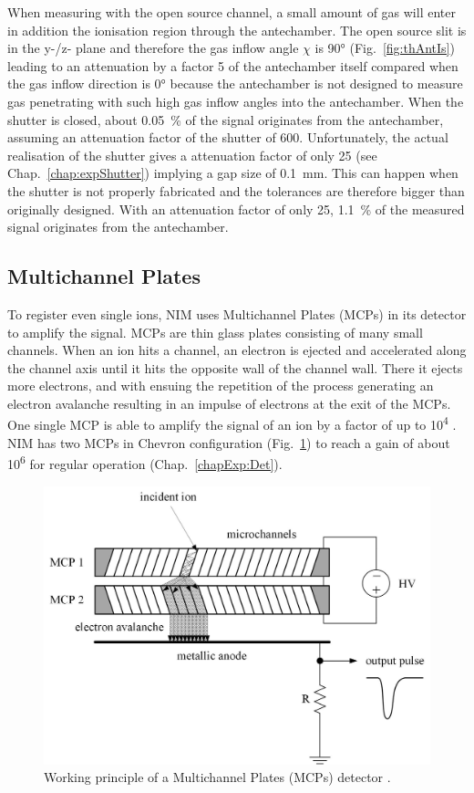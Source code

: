 	When measuring with the open source channel, a small amount of gas will enter in addition the ionisation region through the antechamber. The open source slit is in the y-/z- plane and therefore the gas inflow angle $\chi$ is 90° (Fig.~\ref{fig:thAntIs}) leading to an attenuation by a factor 5 of the antechamber itself compared when the gas inflow direction is 0° because the antechamber is not designed to measure gas penetrating with such high gas inflow angles into the antechamber. When the shutter is closed, about 0.05~\% of the signal originates from the antechamber, assuming an attenuation factor of the shutter of 600. Unfortunately, the actual realisation of the shutter gives a attenuation factor of only 25 (see Chap.~\ref{chap:expShutter}) implying a gap size of 0.1~mm. This can happen when the shutter is not properly fabricated and the tolerances are therefore bigger than originally designed. With an attenuation factor of only 25, 1.1~\% of the measured signal originates from the antechamber.\\
	
	
	\subsection{Multichannel Plates}\label{sec:DetParam}
	To register even single ions, NIM uses Multichannel Plates (MCPs) in its detector to amplify the signal. MCPs are thin glass plates consisting of many small channels. When an ion hits a channel, an electron is ejected and accelerated along the channel axis until it hits the opposite wall of the channel wall. There it ejects more electrons, and with ensuing the repetition of the process generating an electron avalanche resulting in an impulse of electrons at the exit of the MCPs. One single MCP is able to amplify the signal of an ion by a factor of up to 10\textsuperscript{4} \cite{Wiza_1979_MCP}. NIM has two MCPs in Chevron configuration (Fig.~\ref{fig:MCPPrincipleSchema}) to reach a gain of about 10\textsuperscript{6} for regular operation (Chap.~\ref{chapExp:Det}).
	\begin{figure}[h]
		\centering
		\includegraphics[width=.7\textwidth]{Bilder/MCP_PrinipleSchema.jpg}
		\caption{Working principle of a Multichannel Plates (MCPs) detector \cite{Wiza_1979_MCP,Diss_Meyer}.}
		\label{fig:MCPPrincipleSchema}
	\end{figure}
	
